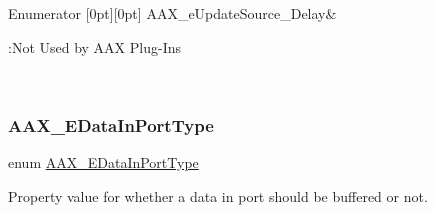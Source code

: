 \begin{DoxyEnumFields}{Enumerator}
[0pt][0pt]{}\mbox{\label{a00491_a30be0398faf20c6b121239eb9399f3f7a221226f8de93849d1f5bbe773b230a3a}} 
A\+A\+X\+\_\+e\+Update\+Source\+\_\+\+Delay&\begin{DoxyRefDesc}{\+:\+Not Used by A\+A\+X Plug-\/\+Ins}
\item[\mbox{\hyperlink{a00789__not_used_by_aax_plugins000001}{\+:\+Not Used by A\+A\+X Plug-\/\+Ins}}]\end{DoxyRefDesc}
\\
\hline

\end{DoxyEnumFields}
\mbox{\label{a00491_ab5677b173ad8647c24d34d28272d11fc}} 
\subsubsection{\texorpdfstring{AAX\_EDataInPortType}{AAX\_EDataInPortType}}
{\footnotesize\ttfamily enum \mbox{\hyperlink{a00491_ab5677b173ad8647c24d34d28272d11fc}{A\+A\+X\+\_\+\+E\+Data\+In\+Port\+Type}}}



Property value for whether a data in port should be buffered or not. 


